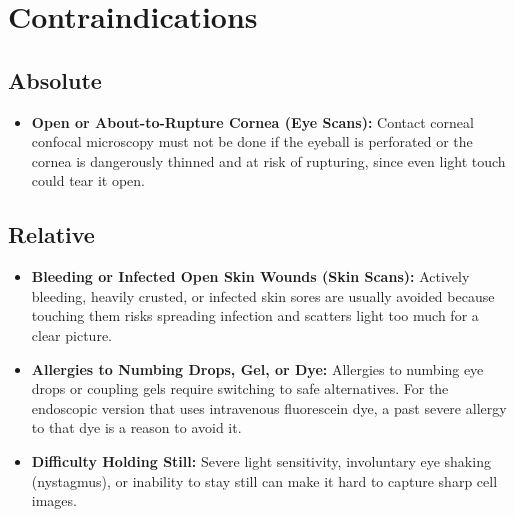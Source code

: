 \section{Contraindications}

\subsection{Absolute}
\begin{itemize}
    \item \textbf{Open or About-to-Rupture Cornea (Eye Scans):} Contact corneal confocal microscopy must not be done if the eyeball is perforated or the cornea is dangerously thinned and at risk of rupturing, since even light touch could tear it open.
\end{itemize}

\subsection{Relative}
\begin{itemize}
    \item \textbf{Bleeding or Infected Open Skin Wounds (Skin Scans):} Actively bleeding, heavily crusted, or infected skin sores are usually avoided because touching them risks spreading infection and scatters light too much for a clear picture.
    \item \textbf{Allergies to Numbing Drops, Gel, or Dye:} Allergies to numbing eye drops or coupling gels require switching to safe alternatives. For the endoscopic version that uses intravenous fluorescein dye, a past severe allergy to that dye is a reason to avoid it.
    \item \textbf{Difficulty Holding Still:} Severe light sensitivity, involuntary eye shaking (nystagmus), or inability to stay still can make it hard to capture sharp cell images.
\end{itemize}

